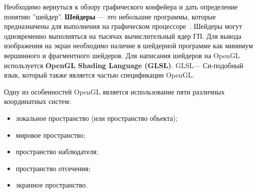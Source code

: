 Необходимо вернуться к обзору графического конфейера и дать определение понятию
''шейдер''. \textbf{Шейдеры} --- это небольшие программы, которые предназначены
для выполнения на графическом процессоре~\cite{LearnOGL}. Шейдеры могут
одновременно выполняться на тысячах вычислительный ядер ГП. Для вывода
изображения на экран необходимо наличие в шейдерной программе как минимум
вершинного и фрагментного шейдеров. Для написания шейдеров на OpenGL
используется \textbf{OpenGL Shading Language (GLSL)}. GLSL\@--- Си-подобный язык,
который также является частью спецификации OpenGL\@.

Одну из особенностей OpenGL является использование пяти различных координатных
систем:
\begin{itemize}
    \item локальное пространство (или пространство объекта);
    \item мировое пространство;
    \item пространство наблюдателя;
    \item пространство отсечения;
    \item экранное пространство.
\end{itemize}

